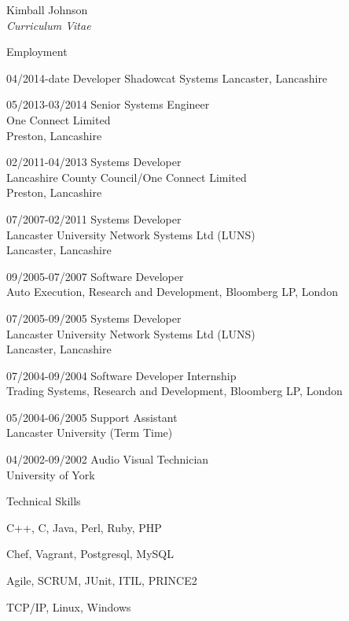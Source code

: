 \documentclass[10pt]{article}
\begin{document}
\begin{cv}{Kimball Johnson\\{\large \itshape Curriculum Vitae}}
\begin{cvlist}{Employment}
    \item[04/2014-date] Developer
    Shadowcat Systems
    Lancaster, Lancashire
    \item[05/2013-03/2014] Senior Systems Engineer\\
    One Connect Limited\\
    Preston, Lancashire
    \item[02/2011-04/2013] Systems Developer\\
    Lancashire County Council/One Connect Limited\\
    Preston, Lancashire
    \item[07/2007-02/2011] Systems Developer\\
    Lancaster University Network Systems Ltd (LUNS)\\
    Lancaster, Lancashire
    \item[09/2005-07/2007] Software Developer \\
    Auto Execution, Research and Development, Bloomberg LP,
    London
    \item[07/2005-09/2005] Systems Developer \\ 
    Lancaster University Network Systems Ltd (LUNS)\\
    Lancaster, Lancashire
    \item[07/2004-09/2004] Software Developer Internship\\
    Trading Systems, Research and Development, Bloomberg LP,
    London
    \item[05/2004-06/2005] Support Assistant\\
    Lancaster University (Term Time)
    \item[04/2002-09/2002] Audio Visual Technician\\
    University of York
\end{cvlist}
\setlength{\oldcvlabelwidth}{\cvlabelwidth}
\setlength{\cvlabelwidth}{1em}
\begin{cvlist}{Technical Skills}
		\item C++, C, Java, Perl, Ruby, PHP
		\item Chef, Vagrant, Postgresql, MySQL
		\item Agile, SCRUM, JUnit, ITIL, PRINCE2
		\item TCP/IP, Linux, Windows
\end{cvlist}
\setlength{\cvlabelwidth}{\oldcvlabelwidth}
\pagebreak

\setlength{\oldcvlabelwidth}{\cvlabelwidth}
\setlength{\cvlabelwidth}{1em}
\renewcommand*{\bibindent}{1.5em}


\end{cv}
\end{document}
